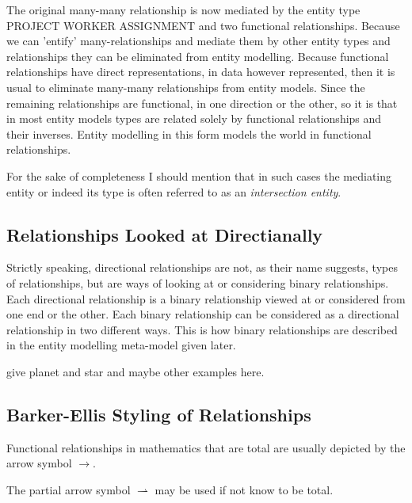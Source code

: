 The original many-many relationship is now mediated by the entity type PROJECT WORKER ASSIGNMENT and two functional relationships. Because we can 'entify' many-relationships and mediate them by other entity types and relationships they can be eliminated from entity modelling. Because functional relationships have direct representations, in data however represented, then it is usual to eliminate many-many relationships from entity models. Since the remaining relationships are functional, in one direction or the other, so it is that in most entity models types are related solely by functional relationships and their inverses. Entity modelling in this form models the world in functional relationships.

\mynote For the sake of completeness I should mention that in such cases the mediating entity or indeed its type is often referred to as an \textit{intersection entity}. 
\subsection*{Relationships Looked at Directianally}
\mynote Strictly speaking, directional relationships are not, as their name suggests, types of relationships, but are ways of looking at or considering binary relationships. Each directional relationship is a binary relationship viewed at or considered from one end or the other. Each binary relationship can be considered as a directional relationship in two different ways.
This is how binary relationships are described in the entity modelling meta-model given later.
\begin{noteforfuture}
give planet and star and maybe other examples here.
\end{noteforfuture}

\subsection*{Barker-Ellis Styling of Relationships}
\mynote Functional relationships in mathematics that are total are usually depicted by the arrow symbol $\longrightarrow$.

The partial arrow symbol $\rightharpoonup$ may be used if not know to be total. 

